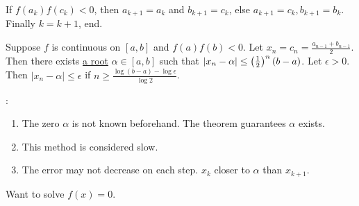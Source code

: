 \documentclass[]{article}
\begin{document}
If $f(a_k)f(c_k)<0$, then $a_{k+1}=a_k$ and $b_{k+1}=c_k$, else $a_{k+1}=c_k,b_{k+1}=b_k$. Finally $k=k+1$, end.

\begin{theorem}
	Suppose $f$ is continuous on $[a,b]$ and $f(a)f(b)<0$.
	Let $x_n=c_n = \frac{a_{n-1}+b_{n-1}}2$.
	Then there exists \ul{a root} $\alpha\in[a,b]$ such that $|x_n-\alpha|\leq\left(\frac12\right)^n(b-a)$.
	Let $\epsilon>0$. Then $|x_n-\alpha|\leq\epsilon$ if $n\geq\frac{\log(b-a)-\log\epsilon}{\log2}$.
\end{theorem}
\begin{note}:
	\begin{enumerate}
		\item The zero $\alpha$ is not known beforehand. The theorem guarantees $\alpha$ exists.
		\item This method is considered slow.
		\item The error may not decrease on each step. $x_k$ closer to $\alpha$ than $x_{k+1}$.
	\end{enumerate}
\end{note}

Want to solve $f(x)=0$.
\end{document}
